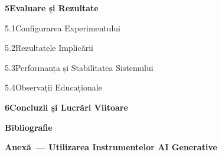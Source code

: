 {\large\noindent\textbf{5\quad Evaluare și Rezultate}\dotfill\textbf{\pageref{cap:evalnress}}\par}
\vspace{2pt}
\noindent\hspace{1.5em}5.1\enspace Configurarea Experimentului\dotfill\pageref{sect:expset}\par
\noindent\hspace{1.5em}5.2\enspace Rezultatele Implicării\dotfill\pageref{sect:engres}\par
\noindent\hspace{1.5em}5.3\enspace Performanța și Stabilitatea Sistemului\dotfill\pageref{sect:perfasses}\par
\noindent\hspace{1.5em}5.4\enspace Observații Educaționale\dotfill\pageref{sect:usrfb}\par
\bigskip

{\large\noindent\textbf{6\quad Concluzii și Lucrări Viitoare}\dotfill\textbf{\pageref{cap:conclfw}}\par}
\bigskip

{\large\noindent\textbf{Bibliografie}\dotfill\textbf{\pageref{chap:bib}}\par}
\bigskip

{\large\noindent\textbf{Anexă~--- Utilizarea Instrumentelor AI Generative}\dotfill\textbf{\pageref{genAIUsage}}\par}
